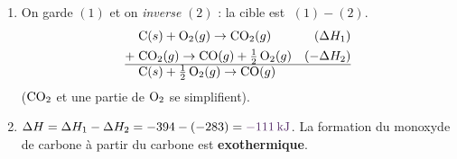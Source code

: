 \documentclass[11pt,a4paper]{article}
\newcommand{\dH}{\Delta H}
\newcommand{\rep}[1]{\textcolor{primarydark}{\textbf{#1}}}
\begin{document}
\begin{correction}
\begin{enumerate}[label=\alph*),leftmargin=2em,topsep=2pt,itemsep=2pt]
  \item On garde $(1)$ et on \emph{inverse} $(2)$ : la cible est $\;(1) - (2)$.
  \begin{align*}
    & \ce{C}(s) + \ce{O2}(g) \rightarrow \ce{CO2}(g) & (\dH_1)\\
    + \;& \ce{CO2}(g) \rightarrow \ce{CO}(g) + \tfrac12\,\ce{O2}(g) & (-\dH_2)\\
    \hline
    & \ce{C}(s) + \tfrac12\,\ce{O2}(g) \rightarrow \ce{CO}(g) &
  \end{align*}
  ($\ce{CO2}$ et une partie de $\ce{O2}$ se simplifient).
  \item $\dH = \dH_1 - \dH_2 = -394 - (-283) = \rep{\SI{-111}{\kilo\joule}}$. La formation du monoxyde de
        carbone à partir du carbone est \rep{exothermique}.
\end{enumerate}
\end{correction}
\end{document}

